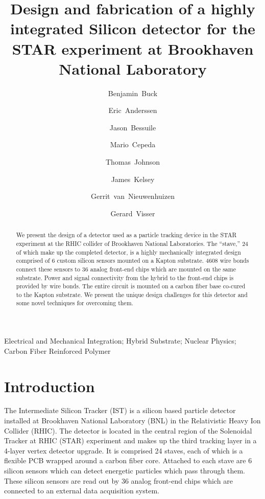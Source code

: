 \documentclass[1p,12pt]{elsarticle}
\begin{document}
\begin{frontmatter}
\title{Design and fabrication of a highly integrated Silicon detector for the
STAR experiment at Brookhaven National Laboratory}
%
\author[mit]{Benjamin~Buck}
\author[lbl]{Eric~Anderssen}
\author[mit]{Jason~Bessuile}
\author[lbl]{Mario~Cepeda}
\author[lbl]{Thomas~Johnson}
\author[mit]{James~Kelsey}
\author[mit]{Gerrit~van~Nieuwenhuizen}
\author[iu]{Gerard~Visser}
\address[iu]{Indiana University, Bloomington, IN, USA}
\address[lbl]{Lawrence Berkeley National Laboratory, Berkeley, CA, USA}
\address[mit]{Massachusetts Institute of Technology, Cambridge, MA, USA}
%
%
\begin{abstract}
We present the design of a detector used as a particle tracking device in the
STAR experiment at the RHIC collider of Brookhaven National Laboratories. The
``stave,'' 24 of which make up the completed detector, is a highly mechanically
integrated design comprised of 6 custom silicon sensors mounted on a Kapton
substrate. 4608 wire bonds connect these sensors to 36 analog front-end chips
which are mounted on the same substrate. Power and signal connectivity from the
hybrid to the front-end chips is provided by wire bonds. The entire circuit is
mounted on a carbon fiber base co-cured to the Kapton substrate. We present the
unique design challenges for this detector and some novel techniques for
overcoming them.
\end{abstract}
\begin{keyword}
Electrical and Mechanical Integration; Hybrid Substrate; Nuclear Physics; Carbon
Fiber Reinforced Polymer
\end{keyword}
\end{frontmatter}
%
\section{Introduction}
The Intermediate Silicon Tracker (IST) is a silicon based particle detector
installed at Brookhaven National Laboratory (BNL) in the Relativistic Heavy Ion
Collider (RHIC). The detector is located in the central region of the
Solenoidal Tracker at RHIC (STAR) experiment
and makes up the third tracking layer in a 4-layer vertex detector
upgrade. It is comprised 24 staves, each of which is a flexible PCB wrapped
around a carbon fiber core. Attached to each stave are 6 silicon sensors which
can detect energetic particles which pass through them. These silicon sensors are read
out by 36 analog front-end chips which are connected to an external data acquisition system.
\end{document}
